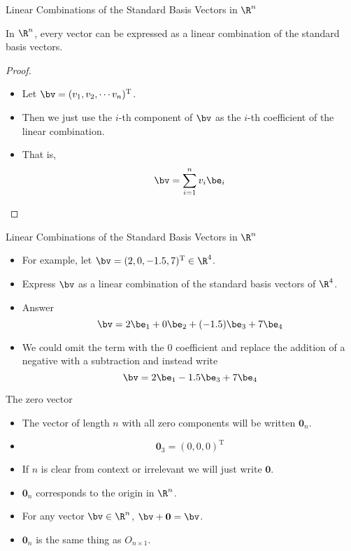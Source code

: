 \documentclass{beamer}
\begin{document}
\begin{frame}{Linear Combinations of the Standard Basis Vectors in $\R^n$}

\begin{lemma}
In $\R^n$, every vector can be expressed as a linear combination of the standard
basis vectors.
\end{lemma}

\begin{proof}
\begin{itemize}
\item Let $\bv = (v_1, v_2, \cdots v_n)^{\text{T}}$.
\item Then we just use the $i$-th component of $\bv$ as the $i$-th coefficient
of the linear combination.
\item That is,
$$\bv = \sum _{i=1}^{n} v_i \be_i$$
\end{itemize}
\end{proof}

\end{frame}

\begin{frame}{Linear Combinations of the Standard Basis Vectors in $\R^n$}

\begin{itemize}
\item For example, let $\bv = (2, 0, -1.5, 7)^{\text{T}} \in \R^4$.
\item Express $\bv$ as a linear combination of the standard basis vectors of
$\R^4$.
\item Answer $$\bv = 2 \be_1 + 0 \be_2 + (-1.5) \be_3 + 7 \be_4$$
\item We could omit the term with the 0 coefficient and replace the addition
of a negative with a subtraction and instead write
$$\bv = 2 \be_1 -1.5 \be_3 + 7 \be_4$$
\end{itemize}

\end{frame}

\begin{frame}{The zero vector}

\begin{itemize}
\item The vector of length $n$ with all zero components will be written $\mathbf{0}_n$.
\item $$\mathbf{0}_3 = (0,0,0)^{\text{T}}$$
\item If $n$ is clear from context or irrelevant we will just write $\mathbf{0}$.
\item $\mathbf{0}_n$ corresponds to the origin in $\R^n$.
\item For any vector $\bv\in\R^n$, $\bv+\mathbf{0} = \bv$.
\item $\mathbf{0}_n$ is the same thing as $O_{n\times 1}$.
\end{itemize}

\end{frame}
\end{document}
